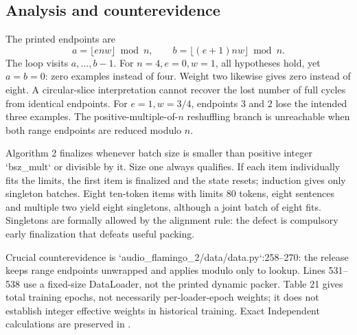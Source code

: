 \documentclass[10pt]{article}
\begin{document}
\subsection*{Analysis and counterevidence}
The printed endpoints are \[a=\lfloor enw\rfloor\bmod n,\qquad
 b=\lfloor(e+1)nw\rfloor\bmod n .\] The loop visits \(a,\ldots,b-1\). For \(n=4,e=0,w=1\), all hypotheses hold, yet \(a=b=0\): zero examples instead of four. Weight two likewise gives zero instead of eight. A circular-slice interpretation cannot recover the lost number of full cycles from identical endpoints. For \(e=1,w=3/4\), endpoints 3 and 2 lose the intended three examples. The positive-multiple-of-\(n\) reshuffling branch is unreachable when both range endpoints are reduced modulo \(n\).\par
Algorithm 2 finalizes whenever batch size is smaller than positive integer `bsz\_mult` or divisible by it. Size one always qualifies. If each item individually fits the limits, the first item is finalized and the state resets; induction gives only singleton batches. Eight ten-token items with limits 80 tokens, eight sentences and multiple two yield eight singletons, although a joint batch of eight fits. Singletons are formally allowed by the alignment rule: the defect is compulsory early finalization that defeats useful packing.\par
Crucial counterevidence is `audio\_flamingo\_2/data/data.py`:258–270: the release keeps range endpoints unwrapped and applies modulo only to lookup. Lines 531–538 use a fixed-size DataLoader, not the printed dynamic packer. Table 21 gives total training epochs, not necessarily per-loader-epoch weights; it does not establish integer effective weights in historical training. Exact Independent calculations are preserved in .\par
\end{document}
